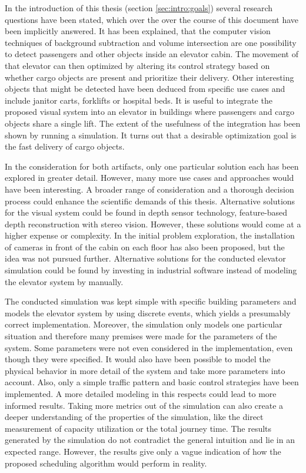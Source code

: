 In the introduction of this thesis (section \ref{sec:intro:goals}) several research questions have been stated,
which over the over the course of this document have been implicitly answered.
It has been explained, that the computer vision techniques of background subtraction and volume intersection are one possibility to detect passengers and other objects inside an elevator cabin. 
The movement of that elevator can then optimized by altering its control strategy based on whether cargo objects are present and prioritize their delivery.
Other interesting objects that might be detected have been deduced from specific use cases and include janitor carts, forklifts or hospital beds.
It is useful to integrate the proposed visual system into an elevator in buildings where passengers and cargo objects share a single lift.
The extent of the usefulness of the integration has been shown by running a simulation. 
It turns out that a desirable optimization goal is the fast delivery of cargo objects.

In the consideration for both artifacts, only one particular solution each has been explored in greater detail.
However, many more use cases and approaches would have been interesting.
A broader range of consideration and a thorough decision process could enhance the scientific demands of this thesis.
Alternative solutions for the visual system could be found in depth sensor technology, feature-based depth reconstruction with stereo vision.
However, these solutions would come at a higher expense or complexity.
In the initial problem exploration, the installation of cameras in front of the cabin on each floor has also been proposed, but the idea was not pursued further. 
Alternative solutions for the conducted elevator simulation could be found by investing in industrial software instead of modeling the elevator system by manually. 

The conducted simulation was kept simple with specific building parameters 
and models the elevator system by using discrete events, which yields a presumably correct implementation.
Moreover, the simulation only models one particular situation and therefore many premises were made for the parameters of the system.
Some parameters were not even considered in the implementation, even though they were specified.
It would also have been possible to model the physical behavior in more detail of the system and take more parameters into account.
Also, only a simple traffic pattern and basic control strategies have been implemented. 
A more detailed modeling in this respects could lead to more informed results. 
Taking more metrics out of the simulation can also create a deeper understanding of the properties of the simulation, like the direct measurement of capacity utilization or the total journey time.
The results generated by the simulation do not contradict the general intuition and lie in an expected range. 
However, the results give only a vague indication of how the proposed scheduling algorithm would perform in reality.

